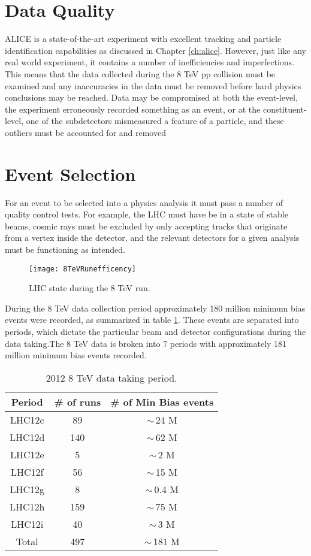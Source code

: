 \section{Data Quality}
ALICE is a state-of-the-art experiment with excellent tracking and particle identification capabilities as discussed in Chapter \ref{ch:alice}.  However, just like any real world experiment, it contains a number of inefficiencies and imperfections.  This means that the data collected during the 8 TeV pp collision must be examined and any inaccuracies in the data must be removed before hard physics conclusions may be reached.  Data may be compromised at both the event-level, the experiment erroneously recorded something as an event, or at the constituent-level, one of the subdetectors mismeasured a feature of a particle, and these outliers must be accounted for and removed 
\section{Event Selection}

For an event to be selected into a physics analysis it must pass a number of quality control tests.  For example, the LHC must have be in a state of stable beams, cosmic rays must be excluded by only accepting tracks that originate from a vertex inside the detector, and the relevant detectors for a given analysis must be functioning as intended.  

\begin{figure}[h]
\texttt{[image: 8TeVRunefficency]}
\centering
\caption{LHC state during the 8 TeV run. }
\label{fig:RunEff}
\end{figure}

During the 8 TeV data collection period approximately 180 million minimum bias events were recorded, as summarized in table \ref{tab:RunSummary}.  These events are separated into periods, which dictate the particular beam and detector configurations during the data taking.The 8 TeV data is broken into 7 periods with approximately 181 million minimum bias events recorded.

\begin{table}[hb]
\label{tab:RunSummary}
\begin{center}
\begin{tabular}[b]{|c|c|c|}
	\hline
	Period & \# of runs & \# of Min Bias events \\ \hline
	LHC12c & 89 & $\sim \,$24 M \\ \hline
	LHC12d & 140 & $\sim \,$62 M \\ \hline
	LHC12e & 5 & $\sim \,$2 M \\ \hline
	LHC12f & 56 & $\sim \,$15 M \\ \hline
	LHC12g & 8 & $\sim \,$0.4 M \\ \hline
	LHC12h & 159 & $\sim \,$75 M \\ \hline
	LHC12i & 40 & $\sim \,$3 M \\ \hline
	Total & 497 & $\sim \,$181 M \\ \hline

\end{tabular}
\end{center}
\caption{2012 8 TeV data taking period.}
\end{table}

